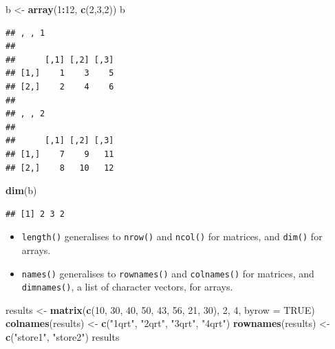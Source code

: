 \documentclass[]{book}
\newenvironment{Shaded}{\begin{snugshade}}{\end{snugshade}}
\newcommand{\DataTypeTok}[1]{\textcolor[rgb]{0.13,0.29,0.53}{#1}}
\newcommand{\DecValTok}[1]{\textcolor[rgb]{0.00,0.00,0.81}{#1}}
\newcommand{\KeywordTok}[1]{\textcolor[rgb]{0.13,0.29,0.53}{\textbf{#1}}}
\newcommand{\NormalTok}[1]{#1}
\newcommand{\OperatorTok}[1]{\textcolor[rgb]{0.81,0.36,0.00}{\textbf{#1}}}
\newcommand{\OtherTok}[1]{\textcolor[rgb]{0.56,0.35,0.01}{#1}}
\newcommand{\StringTok}[1]{\textcolor[rgb]{0.31,0.60,0.02}{#1}}
\providecommand{\tightlist}{%
  \setlength{\itemsep}{0pt}\setlength{\parskip}{0pt}}
\begin{document}
\begin{Shaded}
\begin{Highlighting}[]
\NormalTok{b <-}\StringTok{ }\KeywordTok{array}\NormalTok{(}\DecValTok{1}\OperatorTok{:}\DecValTok{12}\NormalTok{, }\KeywordTok{c}\NormalTok{(}\DecValTok{2}\NormalTok{,}\DecValTok{3}\NormalTok{,}\DecValTok{2}\NormalTok{))}
\NormalTok{b}
\end{Highlighting}
\end{Shaded}

\begin{verbatim}
## , , 1
## 
##      [,1] [,2] [,3]
## [1,]    1    3    5
## [2,]    2    4    6
## 
## , , 2
## 
##      [,1] [,2] [,3]
## [1,]    7    9   11
## [2,]    8   10   12
\end{verbatim}

\begin{Shaded}
\begin{Highlighting}[]
\KeywordTok{dim}\NormalTok{(b)}
\end{Highlighting}
\end{Shaded}

\begin{verbatim}
## [1] 2 3 2
\end{verbatim}

\begin{itemize}
\tightlist
\item
  \texttt{length()} generalises to \texttt{nrow()} and \texttt{ncol()} for matrices, and \texttt{dim()} for arrays.
\item
  \texttt{names()} generalises to \texttt{rownames()} and \texttt{colnames()} for matrices, and \texttt{dimnames()}, a list of character vectors, for arrays.
\end{itemize}

\begin{Shaded}
\begin{Highlighting}[]
\NormalTok{results <-}\StringTok{ }\KeywordTok{matrix}\NormalTok{(}\KeywordTok{c}\NormalTok{(}\DecValTok{10}\NormalTok{, }\DecValTok{30}\NormalTok{, }\DecValTok{40}\NormalTok{, }\DecValTok{50}\NormalTok{, }\DecValTok{43}\NormalTok{, }\DecValTok{56}\NormalTok{, }\DecValTok{21}\NormalTok{, }\DecValTok{30}\NormalTok{), }\DecValTok{2}\NormalTok{, }\DecValTok{4}\NormalTok{, }\DataTypeTok{byrow =} \OtherTok{TRUE}\NormalTok{)}
\KeywordTok{colnames}\NormalTok{(results) <-}\StringTok{ }\KeywordTok{c}\NormalTok{(}\StringTok{"1qrt"}\NormalTok{, }\StringTok{"2qrt"}\NormalTok{, }\StringTok{"3qrt"}\NormalTok{, }\StringTok{"4qrt"}\NormalTok{)}
\KeywordTok{rownames}\NormalTok{(results) <-}\StringTok{ }\KeywordTok{c}\NormalTok{(}\StringTok{"store1"}\NormalTok{, }\StringTok{"store2"}\NormalTok{)}
\NormalTok{results}
\end{Highlighting}
\end{Shaded}
\end{document}
